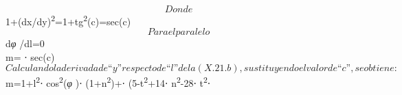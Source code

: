 \documentclass[]{article}
\begin{document}
{}\[ Donde

\]1+\left(dx/dy\right)\textsuperscript{2}=1+tg\textsuperscript{2}\left(c\right)=sec\left(c\right)\[
Para el paralelo
\]d\emph{φ} /dl=0\[

\]m=\cdot
{}⋅
sec\left(c\right)\[ Calculando la derivada de “y” respecto de
“l” de la (X.21.b), sustituyendo el valor de “c”, se obtiene:

\]m=1+l\textsuperscript{2}⋅ cos\textsuperscript{2}\left(\emph{φ}
\right)⋅
\left(1+n\textsuperscript{2}\right)+⋅ \left(5-t\textsuperscript{2}+14⋅
n\textsuperscript{2}-28⋅ t\textsuperscript{2}⋅
\end{document}
